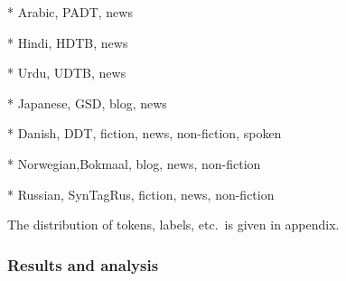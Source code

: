 * Arabic,   PADT, news

* Hindi,    HDTB, news

* Urdu,     UDTB, news

* Japanese, GSD, blog, news

* Danish,   DDT, fiction, news, non-fiction, spoken

* Norwegian,Bokmaal, blog, news, non-fiction

* Russian,  SynTagRus, fiction, news, non-fiction

The distribution of tokens, labels, etc.\ is given in appendix.

\subsubsection{Results and analysis}


\pagebreak
